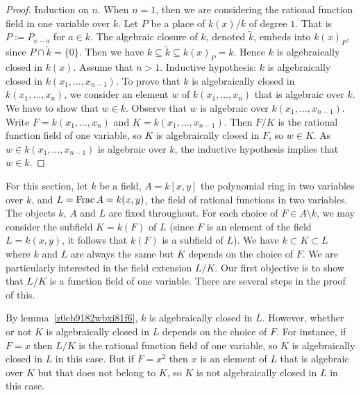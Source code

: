 \begin{proof}
Induction on $n$. When $n= 1$, then we are considering 
the rational function field in one variable over $k $.
Let $P$ be a place of $k(x)/k$ of degree $1$. That is
$P:=P_{x-a}$ for $a \in k$. The algebraic closure of 
$k$, denoted $\tilde{k}$, embeds into $k(x)_P$, since 
$P \cap \tilde{k} = \lbrace 0 \rbrace$. Then we have 
$k \subseteq \tilde{k} \subseteq k(x)_P = k$. 
Hence $k$ is algebraically closed in $k(x)$. 
Assume that $n>1$.
Inductive hypothesis: $k$ is algebraically closed 
in $k(x_1, \dots, x_{n-1})$.
To prove that $k$ is algebraically closed in $k(x_1, \dots, x_n)$, we consider
an element $w$ of $k(x_1, \dots, x_n)$ that is algebraic 
over $k$. We have to show that $w \in k$.
Observe that $w$ is algebraic over $k(x_1, \dots, x_{n-1})$.
Write $F = k(x_1, \dots, x_{n})$ and $K = k(x_1, \dots, x_{n-1})$.
Then $F/K$ is the rational function field of one variable, 
so $K$ is algebraically closed in $F$, so $w \in K$.
As $w \in k(x_1, \dots, x_{n-1})$ is algebraic over $k$, 
the inductive hypothesis implies that $w \in k$.
\end{proof}



For this section, let $ k$ be a field, $A =  k[x,y]$ 
the polynomial ring in two variables over $ k$,
and $L= \operatorname{{\rm Frac}} A =  k(x,y)$, the field of rational functions in two variables.
The objects $ k$, $A$ and $L$ are fixed throughout.
For each choice of $F \in A \setminus  k$, 
we may consider the subfield $K= k(F)$ of $L$
(since $F$ is an element of the field $L =  k(x,y)$, 
it follows that $ k(F)$ is a subfield of $L$).
We have $ k \subset K \subset L$ where $ k$ 
and $L$ are always the same but $K$ depends on the choice of $F$.
We are particularly interested in the field extension $L/K$.
Our first objective is to show that $L/K$ is a function field 
of one variable.
There are several steps in the proof of this.

\begin{remark}
By lemma~\ref{z0cb9182wbxi81f6}, $ k$ is algebraically closed in $L$.
However, whether or not $K$ is algebraically closed in $L$ depends on the choice of $F$.
For instance, if $F=x$ then $L/K$ is the rational function field of one variable, so $K$ is algebraically closed 
in $L$ in this case.  But if $F = x^2$ then $x$ is an element of $L$ that is algebraic over $K$ but that does not 
belong to $K$, so $K$ is not algebraically closed in $L$ in this case.
\end{remark}

